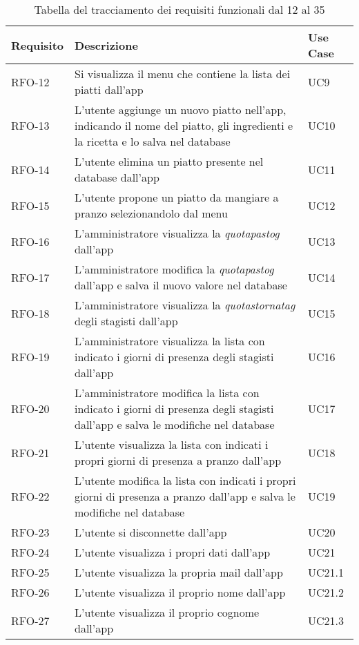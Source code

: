 \begin{table}%
\caption{Tabella del tracciamento dei requisiti funzionali dal 12 al 35}
\label{tab:requisiti-funzionalidue}
\begin{tabularx}{\textwidth}{lXl}
\hline
\textbf{Requisito} & \textbf{Descrizione} & \textbf{Use Case}\\
\hline\hline
RFO-12    & Si visualizza il menu che contiene la lista dei piatti dall'app & UC9 \\
\hline
RFO-13    & L'utente aggiunge un nuovo piatto nell'app, indicando il nome del piatto, gli ingredienti e la ricetta e lo salva nel database & UC10 \\
\hline
RFO-14    & L'utente elimina un piatto presente nel database dall'app & UC11 \\
\hline
RFO-15    & L'utente propone un piatto da mangiare a pranzo selezionandolo dal menu & UC12 \\
\hline
RFO-16    & L'amministratore visualizza la \emph{\gls{quotapastog}} dall'app & UC13 \\
\hline
RFO-17    & L'amministratore modifica la \emph{\gls{quotapastog}} dall'app e salva il nuovo valore nel database & UC14 \\
\hline
RFO-18    & L'amministratore visualizza la \emph{\gls{quotastornatag}} degli stagisti dall'app & UC15 \\
\hline
RFO-19    & L'amministratore visualizza la lista con indicato i giorni di presenza degli stagisti dall'app & UC16 \\
\hline
RFO-20    & L'amministratore modifica la lista con indicato i giorni di presenza degli stagisti dall'app e salva le modifiche nel database & UC17 \\
\hline
RFO-21    & L'utente visualizza la lista con indicati i propri giorni di presenza a pranzo dall'app & UC18 \\
\hline
RFO-22    & L'utente modifica la lista con indicati i propri giorni di presenza a pranzo dall'app e salva le modifiche nel database & UC19 \\
\hline
RFO-23    & L'utente si disconnette dall'app & UC20 \\
\hline
RFO-24    & L'utente visualizza i propri dati dall'app & UC21 \\
\hline
RFO-25    & L'utente visualizza la propria mail dall'app & UC21.1 \\
\hline
RFO-26    & L'utente visualizza il proprio nome dall'app & UC21.2 \\
\hline
RFO-27    & L'utente visualizza il proprio cognome dall'app & UC21.3 \\

\end{tabularx}
\end{table}
